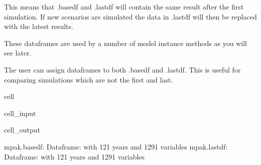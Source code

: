 \documentclass[letterpaper,10pt,english]{jupyterBook}
\begin{document}
\sphinxAtStartPar
This means that .basedf and .lastdf will contain the same result after the first simulation. 
If new scenarios are simulated the data in .lastdf will then be replaced with the latest results.

\sphinxAtStartPar
These dataframes are used by a number of model instance methods as you will see later.

\sphinxAtStartPar
The user can assign dataframes to both .basedf and .lastdf. This is useful for comparing simulations which are not the first and last.

\begin{sphinxuseclass}{cell}\begin{sphinxVerbatimInput}

\begin{sphinxuseclass}{cell_input}
\begin{sphinxVerbatim}[commandchars=\\\{\}]
\PYG{p}{[}\PYG{p}{]}\PYG{p}{[}\PYG{p}{]}
\PYG{p}{[}\PYG{p}{]}\PYG{p}{[}\PYG{p}{]}
\end{sphinxVerbatim}

\end{sphinxuseclass}\end{sphinxVerbatimInput}
\begin{sphinxVerbatimOutput}

\begin{sphinxuseclass}{cell_output}
\begin{sphinxVerbatim}[commandchars=\\\{\}]
mpak.basedf: Dataframe: with 121 years and 1291 variables
mpak.lastdf: Dataframe: with 121 years and 1291 variables
\end{sphinxVerbatim}

\end{sphinxuseclass}\end{sphinxVerbatimOutput}

\end{sphinxuseclass}
\end{document}
